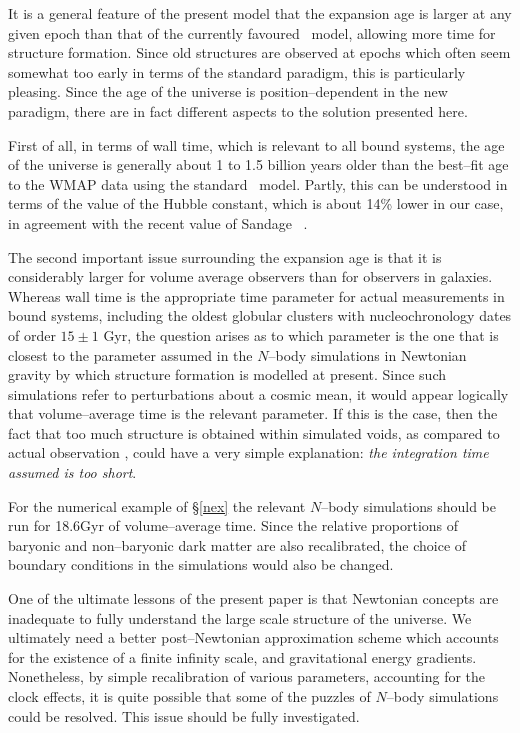 \documentclass[12pt]{iopart}
\begin{document}
It is a general feature of the present model that the expansion age
is larger at any given epoch than that of the currently favoured
\LCDM\ model, allowing more time for structure formation. Since
old structures are observed at epochs which often seem somewhat too
early in terms of the standard paradigm, this is particularly pleasing.
Since the age of the universe is position--dependent in the new
paradigm, there are in fact different aspects to the solution presented
here.

First of all, in terms of wall time, which is relevant to all bound
systems, the age of the universe is generally about 1 to 1.5 billion
years older than the best--fit age to the WMAP data \cite{wmap} using
the standard \LCDM\ model. Partly, this can be understood in terms of
the value of the Hubble constant, which is about 14\% lower in our case, in
agreement with the recent value of Sandage \etal\ \cite{Sandage}.

The second important issue surrounding the expansion age is that it is
considerably larger for volume average observers than for observers
in galaxies. Whereas wall time is the appropriate time parameter for
actual measurements in bound systems, including the oldest globular clusters
with nucleochronology dates of order $15\pm1$ Gyr, the question arises as
to which parameter is the one that is closest to the parameter assumed in
the $N$--body simulations in Newtonian gravity by which structure formation
is modelled at present. Since such simulations refer to perturbations
about a cosmic mean, it would appear logically that volume--average
time is the relevant parameter. If this is the case, then the fact
that too much structure is obtained within simulated voids, as compared to
actual observation \cite{P_void,P_void2}, could have a very simple
explanation: {\em the integration time assumed is too short}.

For the numerical example of \S\ref{nex} the relevant $N$--body simulations
should be run for 18.6Gyr of volume--average time. Since the relative
proportions of baryonic and non--baryonic dark matter are also recalibrated,
the choice of boundary conditions in the simulations would also be changed.

One of the ultimate lessons of the present paper is that Newtonian concepts
are inadequate to fully understand the large scale structure of the universe.
We ultimately need a better post--Newtonian approximation scheme which
accounts for the existence of a finite infinity scale, and gravitational
energy gradients. Nonetheless, by simple recalibration of various parameters,
accounting for the clock effects, it is quite possible that some of the
puzzles of $N$--body simulations could be resolved. This issue should be
fully investigated.
\end{document}
